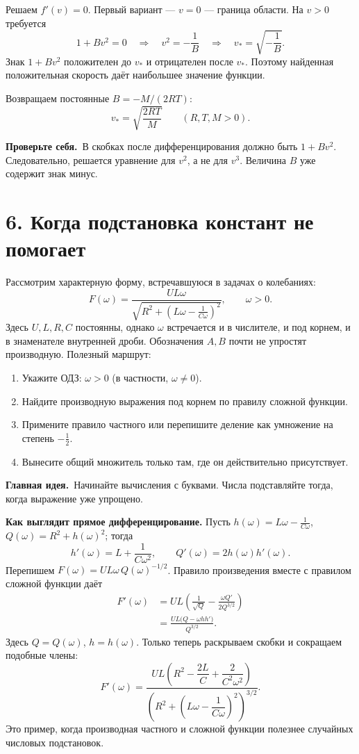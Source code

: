 \documentclass[a4paper,12pt]{article}
\newcommand{\idea}[1]{\par\noindent\textcolor{accentdark}{\textbf{Главная идея.}}\ #1\par}
\newcommand{\note}[1]{\par\noindent\textcolor{redink}{\textbf{Проверьте себя.}}\ #1\par}
\begin{document}
Решаем $f'(v)=0$. Первый вариант --- $v=0$ --- граница области. На $v>0$ требуется
\[
1+Bv^2=0\quad\Longrightarrow\quad
 v^2=-\frac1B\quad\Longrightarrow\quad
 \boxed{v_*=\sqrt{-\frac1B}}.
\]
Знак $1+Bv^2$ положителен до $v_*$ и отрицателен после $v_*$. Поэтому найденная положительная скорость даёт наибольшее значение функции.

Возвращаем постоянные $B=-M/(2RT)$:
\[
\boxed{v_*=\sqrt{\frac{2RT}{M}}}\qquad
(R,T,M>0).
\]
\note{В скобках после дифференцирования должно быть $1+Bv^2$. Следовательно, решается уравнение для $v^2$, а не для $v^3$. Величина $B$ уже содержит знак минус.}

\section*{6. Когда подстановка констант не помогает}
Рассмотрим характерную форму, встречавшуюся в задачах о колебаниях:
\[
F(\omega)=\frac{UL\omega}
{\sqrt{R^2+\left(L\omega-\frac1{C\omega}\right)^2}},\qquad\omega>0.
\]
Здесь $U,L,R,C$ постоянны, однако $\omega$ встречается и в числителе, и под корнем, и в знаменателе внутренней дроби. Обозначения $A,B$ почти не упростят производную. Полезный маршрут:
\begin{enumerate}
 \item Укажите ОДЗ: $\omega>0$ (в частности, $\omega\ne0$).
 \item Найдите производную выражения под корнем по правилу сложной функции.
 \item Примените правило частного или перепишите деление как умножение на степень $-\frac12$.
 \item Вынесите общий множитель только там, где он действительно присутствует.
\end{enumerate}
\idea{Начинайте вычисления с буквами. Числа подставляйте тогда, когда выражение уже упрощено.}

\textbf{Как выглядит прямое дифференцирование.}
Пусть $h(\omega)=L\omega-\frac1{C\omega}$,
$Q(\omega)=R^2+h(\omega)^2$; тогда
\[
 h'(\omega)=L+\frac1{C\omega^2},\qquad
 Q'(\omega)=2h(\omega)h'(\omega).
\]
Перепишем $F(\omega)=UL\omega\,Q(\omega)^{-1/2}$. Правило
произведения вместе с правилом сложной функции даёт
\begin{align*}
 F'(\omega)
 &=UL\left(\frac1{\sqrt Q}-\frac{\omega Q'}{2Q^{3/2}}\right)\\
 &=\frac{UL\bigl(Q-\omega h h'\bigr)}{Q^{3/2}}.
\end{align*}
Здесь $Q=Q(\omega)$, $h=h(\omega)$. Только теперь раскрываем
скобки и сокращаем подобные члены:
\[
\boxed{F'(\omega)=\frac{UL\left(R^2-\dfrac{2L}{C}
   +\dfrac{2}{C^2\omega^2}\right)}
 {\left(R^2+\left(L\omega-\dfrac1{C\omega}\right)^2\right)^{3/2}}.}
\]
Это пример, когда производная частного и сложной функции
полезнее случайных числовых подстановок.
\clearpage
\end{document}
